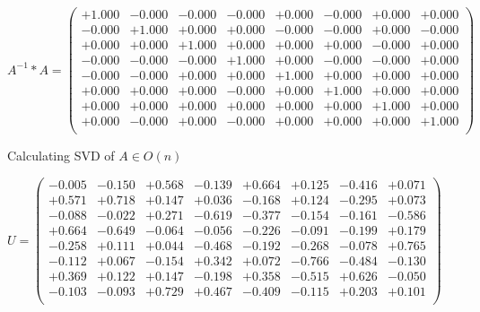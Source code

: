 \documentclass[9pt]{article}
\theoremstyle{plain}
\theoremstyle{definition}
\theoremstyle{remark}
\numberwithin{equation}{section}
\begin{document}
$A^{-1} *A = \left(
\begin{array}{
cccccccc}
+1.000 & -0.000 & -0.000 & -0.000 & +0.000 & -0.000 & +0.000 & +0.000 \\
-0.000 & +1.000 & +0.000 & +0.000 & -0.000 & -0.000 & +0.000 & -0.000 \\
+0.000 & +0.000 & +1.000 & +0.000 & +0.000 & +0.000 & -0.000 & +0.000 \\
-0.000 & -0.000 & -0.000 & +1.000 & +0.000 & -0.000 & -0.000 & +0.000 \\
-0.000 & -0.000 & +0.000 & +0.000 & +1.000 & +0.000 & +0.000 & +0.000 \\
+0.000 & +0.000 & +0.000 & -0.000 & +0.000 & +1.000 & +0.000 & +0.000 \\
+0.000 & +0.000 & +0.000 & +0.000 & +0.000 & +0.000 & +1.000 & +0.000 \\
+0.000 & -0.000 & +0.000 & -0.000 & +0.000 & +0.000 & +0.000 & +1.000 \\
\end{array}
\right)$ \newline 

Calculating SVD of  $A \in O(n)$

$U = \left(
\begin{array}{
cccccccc}
-0.005 & -0.150 & +0.568 & -0.139 & +0.664 & +0.125 & -0.416 & +0.071 \\
+0.571 & +0.718 & +0.147 & +0.036 & -0.168 & +0.124 & -0.295 & +0.073 \\
-0.088 & -0.022 & +0.271 & -0.619 & -0.377 & -0.154 & -0.161 & -0.586 \\
+0.664 & -0.649 & -0.064 & -0.056 & -0.226 & -0.091 & -0.199 & +0.179 \\
-0.258 & +0.111 & +0.044 & -0.468 & -0.192 & -0.268 & -0.078 & +0.765 \\
-0.112 & +0.067 & -0.154 & +0.342 & +0.072 & -0.766 & -0.484 & -0.130 \\
+0.369 & +0.122 & +0.147 & -0.198 & +0.358 & -0.515 & +0.626 & -0.050 \\
-0.103 & -0.093 & +0.729 & +0.467 & -0.409 & -0.115 & +0.203 & +0.101 \\
\end{array}
\right)$ \newline 
\end{document}
